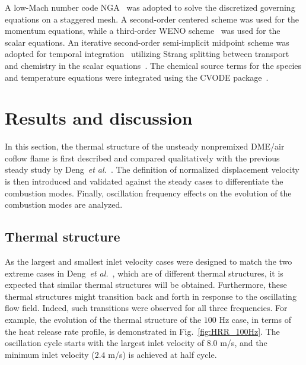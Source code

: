 \documentclass[review,3p,times]{elsarticle}
\begin{document}
A low-Mach number code NGA~\cite{desjardins08} was adopted to solve the discretized governing equations on a staggered mesh.  A second-order centered scheme was used for the momentum equations, while a third-order WENO scheme~\cite{liu94} was used for the scalar equations.  An iterative second-order semi-implicit midpoint scheme was adopted for temporal integration~\cite{pierce01} utilizing Strang splitting between transport and chemistry in the scalar equations\textcolor{Rev1}{~\cite{macart16}}.  The chemical source terms for the species and temperature equations were integrated using the CVODE package~\cite{cohen96}.


\section{Results and discussion}

In this section, the thermal structure of the unsteady nonpremixed DME/air coflow flame is first described and compared qualitatively with the previous steady study by Deng~\emph{et al.}~\cite{deng15b}.  The definition of normalized displacement velocity is then introduced and validated against the steady cases to differentiate the combustion modes.  Finally, oscillation frequency effects on the evolution of the combustion modes are analyzed.   

\subsection{Thermal structure}

As the largest and smallest inlet velocity cases were designed to match the two extreme cases in Deng~\emph{et al.}~\cite{deng15b}, which are of different thermal structures, it is expected that similar thermal structures will be obtained.  Furthermore, these thermal structures might transition back and forth in response to the oscillating flow field.  Indeed, such transitions were observed for all three frequencies.  For example, the evolution of the thermal structure of the $100$ Hz case, in terms of the heat release rate profile, is demonstrated in Fig.~\ref{fig:HRR_100Hz}.  The oscillation cycle starts with the largest inlet velocity of $8.0$ m/s, and the minimum inlet velocity ($2.4$ m/s) is achieved at half cycle.  
\end{document}
